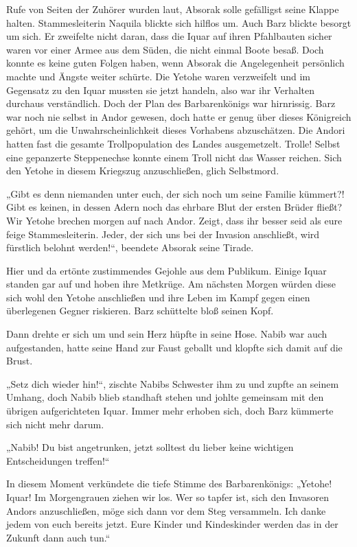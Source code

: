 Rufe von Seiten der Zuhörer wurden laut, Absorak solle gefälligst seine Klappe halten. Stammesleiterin Naquila blickte sich hilflos um. Auch Barz blickte besorgt um sich. Er zweifelte nicht daran, dass die Iquar auf ihren Pfahlbauten sicher waren vor einer Armee aus dem Süden, die nicht einmal Boote besaß. Doch konnte es keine guten Folgen haben, wenn Absorak die Angelegenheit persönlich machte und Ängste weiter schürte. Die Yetohe waren verzweifelt und im Gegensatz zu den Iquar mussten sie jetzt handeln, also war ihr Verhalten durchaus verständlich. Doch der Plan des Barbarenkönigs war hirnrissig. Barz war noch nie selbst in Andor gewesen, doch hatte er genug über dieses Königreich gehört, um die Unwahrscheinlichkeit dieses Vorhabens abzuschätzen. Die Andori hatten fast die gesamte Trollpopulation des Landes ausgemetzelt. Trolle! Selbst eine gepanzerte Steppenechse konnte einem Troll nicht das Wasser reichen. Sich den Yetohe in diesem Kriegszug anzuschließen, glich Selbstmord.

„Gibt es denn niemanden unter euch, der sich noch um seine Familie kümmert?! Gibt es keinen, in dessen Adern noch das ehrbare Blut der ersten Brüder fließt? Wir Yetohe brechen morgen auf nach Andor. Zeigt, dass ihr besser seid als eure feige Stammesleiterin. Jeder, der sich uns bei der Invasion anschließt, wird fürstlich belohnt werden!“, beendete Absorak seine Tirade.

Hier und da ertönte zustimmendes Gejohle aus dem Publikum. Einige Iquar standen gar auf und hoben ihre Metkrüge. Am nächsten Morgen würden diese sich wohl den Yetohe anschließen und ihre Leben im Kampf gegen einen überlegenen Gegner riskieren. Barz schüttelte bloß seinen Kopf.

Dann drehte er sich um und sein Herz hüpfte in seine Hose. Nabib war auch aufgestanden, hatte seine Hand zur Faust geballt und klopfte sich damit auf die Brust.

„Setz dich wieder hin!“, zischte Nabibs Schwester ihm zu und zupfte an seinem Umhang, doch Nabib blieb standhaft stehen und johlte gemeinsam mit den übrigen aufgerichteten Iquar. Immer mehr erhoben sich, doch Barz kümmerte sich nicht mehr darum.

„Nabib! Du bist angetrunken, jetzt solltest du lieber keine wichtigen Entscheidungen treffen!“

In diesem Moment verkündete die tiefe Stimme des Barbarenkönigs: „Yetohe! Iquar! Im Morgengrauen ziehen wir los. Wer so tapfer ist, sich den Invasoren Andors anzuschließen, möge sich dann vor dem Steg versammeln. Ich danke jedem von euch bereits jetzt. Eure Kinder und Kindeskinder werden das in der Zukunft dann auch tun.“

